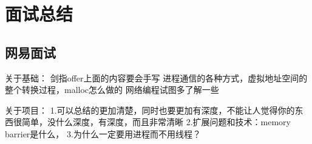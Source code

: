 \section{面试总结}

\subsection{网易面试}
关于基础：
剑指offer上面的内容要会手写
进程通信的各种方式，虚拟地址空间的整个转换过程，malloc怎么做的
网络编程试图多了解一些


关于项目：
1.可以总结的更加清楚，同时也要更加有深度，不能让人觉得你的东西很简单，没什么深度，有深度，而且非常清晰
2.扩展问题和技术：memory barrier是什么，
3.为什么一定要用进程而不用线程？
